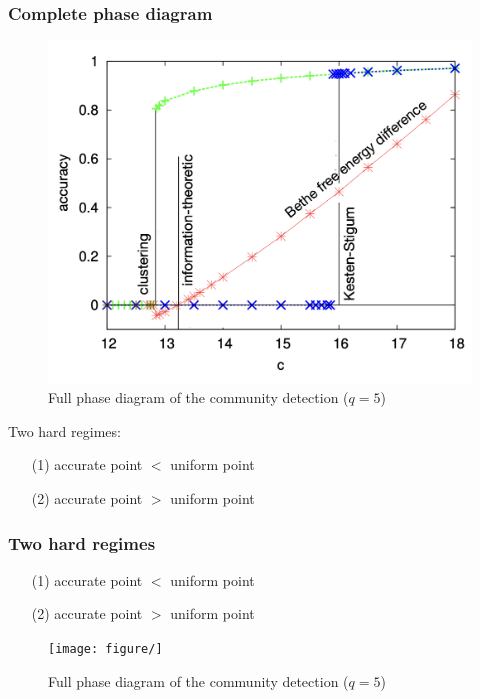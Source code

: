 \documentclass[dvipdfmx,11pt]{beamer}
\begin{document}
\begin{frame}
  \frametitle{Complete phase diagram}
  \begin{figure}
    \centering
    \includegraphics[width=0.55\linewidth]{figure/phase3.png}
    \caption{Full phase diagram of the community detection ($q = 5$)}
  \end{figure}
  Two hard regimes:
  \begin{itemize}
    \item[(1)] accurate point $<$ uniform point 
    \item[(2)] accurate point $>$ uniform point 
  \end{itemize}
\end{frame}

\begin{frame}
  \frametitle{Two hard regimes}
  \begin{itemize}
    \item[(1)] accurate point $<$ uniform point
    
    \item[(2)] accurate point $>$ uniform point
  \end{itemize}

  \begin{figure}
    \centering
    \texttt{[image: figure/]}
    \caption{Full phase diagram of the community detection ($q = 5$)}
  \end{figure}

  

\end{frame}
\end{document}
